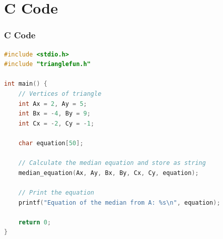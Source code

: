 \documentclass{beamer}
\numberwithin{equation}{section}
\begin{document}
\section{ C Code}
\begin{frame}[fragile]
\frametitle{C Code }
\begin{lstlisting}[language=C]
#include <stdio.h>
#include "trianglefun.h"

int main() {
    // Vertices of triangle
    int Ax = 2, Ay = 5;
    int Bx = -4, By = 9;
    int Cx = -2, Cy = -1;

    char equation[50];

    // Calculate the median equation and store as string
    median_equation(Ax, Ay, Bx, By, Cx, Cy, equation);

    // Print the equation
    printf("Equation of the median from A: %s\n", equation);

    return 0;
}



    
\end{lstlisting}
\end{frame}
\end{document}
